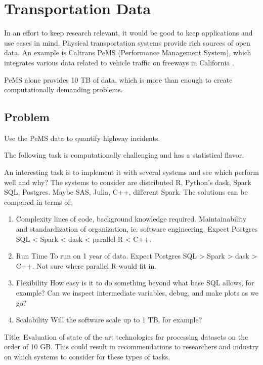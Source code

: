 \documentclass[12pt]{article}
\begin{document}
\section{Transportation Data}

In an effort to keep research relevant, it would be good to keep
applications and use cases in mind. Physical transportation systems provide
rich sources of open data. An example is Caltrans PeMS (Performance
Management System), which integrates various data related to vehicle
traffic on freeways in California \cite{jia2001pems}.

PeMS alone provides 10 TB of data, which is more than enough to create
computationally demanding problems.

\subsection{Problem}

Use the PeMS data to quantify highway incidents.

The following task is computationally challenging and has a statistical
flavor.


An interesting task is to implement it with several systems and see which
perform well and why? The systems to consider are distributed R, Python's
dask, Spark SQL, Postgres. Maybe SAS, Julia, C++, different Spark. The solutions can be compared in terms
of:
\begin{enumerate}
    \item{Complexity} lines of code, background knowledge required.
        Maintainability and standardization of organization, ie. software
        engineering.
        Expect Postgres SQL < Spark < dask < parallel R < C++.
    \item{Run Time} To run on 1 year of data.
        Expect Postgres SQL > Spark > dask > C++. Not sure where parallel R
        would fit in.
    \item{Flexibility} How easy is it to do something beyond what base SQL
        allows, for example? Can we inspect intermediate variables, debug,
        and make plots as we go?
    \item{Scalability} Will the software scale up to 1 TB, for example?
\end{enumerate}

Title: Evaluation of state of the art technologies for processing datasets
on the order of 10 GB. This could result in recommendations to researchers
and industry on which systems to consider for these types of tasks.
\end{document}

